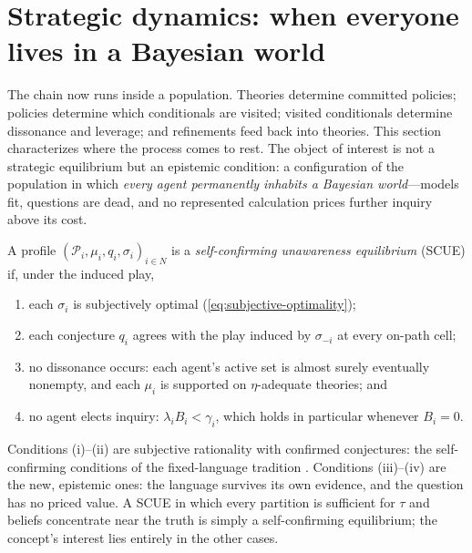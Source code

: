 \section{Strategic dynamics: when everyone lives in a Bayesian world}
\label{sec:dynamics}

The chain now runs inside a population.  Theories determine committed
policies; policies determine which conditionals are visited; visited
conditionals determine dissonance and leverage; and refinements feed back
into theories.  This section characterizes where the process comes to rest.
The object of interest is not a strategic equilibrium but an epistemic
condition: a configuration of the population in which \emph{every agent
permanently inhabits a Bayesian world}---models fit, questions are dead, and
no represented calculation prices further inquiry above its cost.

\begin{definition}
\label{def:scue}
A profile $(\mathcal P_i,\mu_i,q_i,\sigma_i)_{i\in N}$ is a
\emph{self-confirming unawareness equilibrium} (SCUE) if, under the induced
play,
\begin{enumerate}[label=(\roman*)]
  \item each $\sigma_i$ is subjectively optimal
  (\cref{eq:subjective-optimality});
  \item each conjecture $q_i$ agrees with the play induced by $\sigma_{-i}$
  at every on-path cell;
  \item no dissonance occurs: each agent's active set is almost surely
  eventually nonempty, and each $\mu_i$ is supported on $\eta$-adequate
  theories; and
  \item no agent elects inquiry: $\lambda_iB_i<\gamma_i$, which holds in
  particular whenever $B_i=0$.
\end{enumerate}
\end{definition}

Conditions (i)--(ii) are subjective rationality with confirmed conjectures:
the self-confirming conditions of the fixed-language tradition
\citep{FudenbergLevine1993,KalaiLehrer1993b}.  Conditions (iii)--(iv) are the
new, epistemic ones: the language survives its own evidence, and the
question has no priced value.  A SCUE in which every partition is sufficient
for $\tau$ and beliefs concentrate near the truth is simply a
self-confirming equilibrium; the concept's interest lies entirely in the
other cases.


